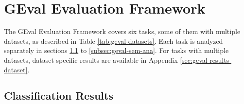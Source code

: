 \documentclass[11pt,titlepage,oneside,openany]{book}
\begin{document}
\section{GEval Evaluation Framework}
\label{sec:geval}

The GEval Evaluation Framework covers six tasks, some of them with multiple datasets, as described in Table \ref{tab:geval-datasets}. Each task is analyzed separately in sections \ref{subsec:geval-clf} to \ref{subsec:geval-sem-ana}. For tasks with multiple datasets, dataset-specific results are available in Appendix \ref{sec:geval-results-dataset}.


\subsection{Classification Results}
\label{subsec:geval-clf}
\end{document}

